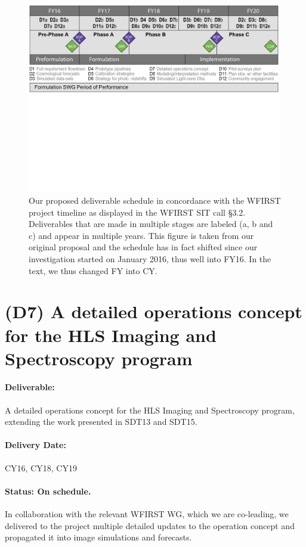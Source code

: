\begin{figure}
\includegraphics[width=0.99\textwidth]{Plots/wfirst_milestones_v2.pdf}
\caption{Our proposed deliverable schedule in concordance with the WFIRST
project timeline as displayed in the WFIRST SIT call \S 3.2. Deliverables that
are made in multiple stages are labeled (a, b and c) and appear in multiple
years. This figure is taken from our original proposal and the schedule has in
fact shifted since our investigation started on January 2016, thus well into
FY16. In the text, we thus changed FY into CY.} \label{tab:milestones_mgt}
\end{figure}


\section*{(D7) A detailed operations concept for the HLS Imaging and Spectroscopy
program}

\paragraph*{Deliverable:} A detailed operations concept for the HLS Imaging and Spectroscopy program, extending the work presented in SDT13 and SDT15.

\paragraph*{Delivery Date:} CY16, CY18, CY19

\paragraph*{Status: On schedule.} In collaboration with the relevant WFIRST WG, which we are co-leading, we delivered to the project multiple detailed updates to the operation concept and propagated it into image simulations and forecasts.


